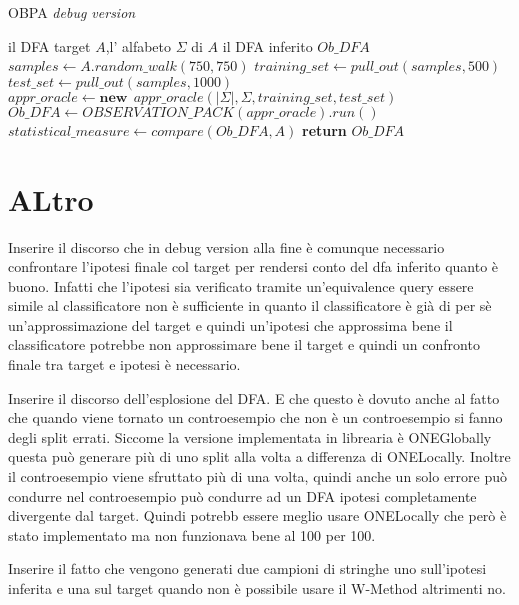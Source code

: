 \begin{algorithm}
\caption{OBPA \textit{debug version}}\label{alg:obpad}
\begin{algorithmic}[1]
\Statex
\Input il \ac{DFA} target $A$,l' alfabeto $\Sigma$ di $A$ 
\Output il \ac{DFA} inferito $Ob\_DFA$
\State $samples \gets A.random\_walk(750,750)$
\State $training\_set \gets pull\_out(samples,500)$
\State $test\_set \gets pull\_out(samples,1000)$
\State $appr\_oracle \gets \textbf{new}\:\: appr\_oracle(|\Sigma|,\Sigma,training\_set,test\_set)$
\State $Ob\_DFA \gets OBSERVATION\_PACK(appr\_oracle).run()$
\State $statistical\_measure \gets compare(Ob\_DFA , A)$
 \State \textbf{return} $Ob\_DFA$
     
\end{algorithmic}
\end{algorithm}





\section{ALtro}
Inserire il discorso che in debug version alla fine è comunque necessario confrontare l'ipotesi finale col target per rendersi conto del dfa inferito quanto è buono. Infatti che l'ipotesi sia verificato tramite un'equivalence query essere simile al classificatore non è sufficiente in quanto il classificatore è già di per sè un'approssimazione del target e quindi un'ipotesi che approssima bene il classificatore potrebbe non approssimare bene il target e quindi un confronto finale tra target e ipotesi è necessario. 

Inserire il discorso dell'esplosione del DFA. E che questo è dovuto anche al fatto che quando viene tornato un controesempio che non è un controesempio si fanno degli split errati. Siccome la versione implementata in librearia è ONEGlobally questa può generare più di uno split alla volta a differenza di ONELocally. Inoltre il controesempio viene sfruttato più di una volta, quindi anche un solo errore può condurre nel controesempio può condurre ad un DFA ipotesi completamente divergente dal target. Quindi potrebb essere meglio usare ONELocally che però è stato implementato ma non funzionava bene al 100 per 100.

Inserire il fatto che vengono generati due campioni di stringhe uno sull'ipotesi inferita e una sul target quando non è possibile usare il W-Method altrimenti no. 

